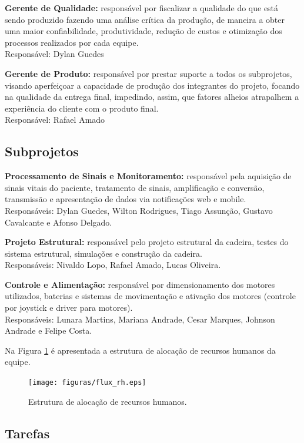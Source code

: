 \textbf{Gerente de Qualidade:} responsável por fiscalizar a qualidade do que está sendo produzido fazendo uma análise crítica da produção, de maneira a obter uma maior confiabilidade, produtividade, redução de custos e otimização dos processos realizados por cada equipe.
\\Responsável: Dylan Guedes

\textbf{Gerente de Produto:} responsável por prestar suporte a todos os subprojetos, visando aperfeiçoar a capacidade de produção dos integrantes do projeto, focando na qualidade da entrega final, impedindo, assim,  que fatores alheios atrapalhem a experiência do cliente com o produto final.
\\Responsável: Rafael Amado

\subsection{Subprojetos}

\textbf{Processamento de Sinais e Monitoramento:} responsável pela aquisição de sinais vitais do paciente,
tratamento de sinais, amplificação e conversão, transmissão e apresentação de
dados via notificações web e mobile.
\\Responsáveis: Dylan Guedes, Wilton Rodrigues, Tiago Assunção, Gustavo Cavalcante e Afonso Delgado.

\textbf{Projeto Estrutural:} responsável pelo projeto estrutural da cadeira, testes
do sistema estrutural, simulações e construção da cadeira.
\\Responsáveis: Nivaldo Lopo, Rafael Amado, Lucas Oliveira.

\textbf{Controle e Alimentação:} responsável por dimensionamento dos motores utilizados,
baterias e sistemas de movimentação e ativação dos motores (controle por
joystick e driver para motores).
\\Responsáveis: Lunara Martins, Mariana Andrade, Cesar Marques, Johnson Andrade e Felipe Costa.

Na Figura \ref{flux_rh} é apresentada a estrutura de alocação de recursos humanos da equipe.


\begin{figure}[h]
    \centering
    \label{flux_rh}
    \texttt{[image: figuras/flux\_rh.eps]}
    \caption{Estrutura de alocação de recursos humanos.}
\end{figure}

\subsection{Tarefas}


